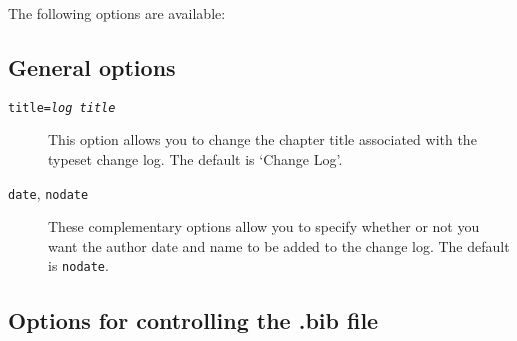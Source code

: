 \documentclass[a4paper,12pt,twoside,openany]{memoir}
\begin{document}
The following options are available:

\subsection{General options}

\begin{description}

\item[\texttt{title=\textit{log title}}]
This option allows you to change the chapter title associated with 
the typeset change log.
The default is `Change Log'.

\item[\texttt{date}, \texttt{nodate}]
These complementary options
allow you to specify whether or not you want 
the author date and name to be added to the change log.
The default is \texttt{nodate}.


\end{description}

\subsection{Options for controlling the .bib file}
\end{document}
